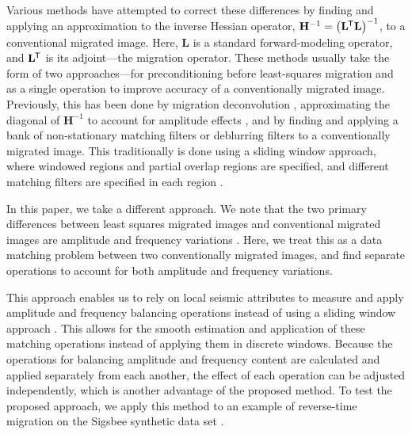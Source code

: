     Various methods have attempted to correct these differences by finding and applying an approximation to the inverse Hessian operator, $\mathbf{H}^{-1} = \left (\mathbf{L}^{\mkern-1.5mu\mathsf{T}}\mathbf{L} \right )^{-1}$, to a conventional migrated image.
    Here, $\mathbf{L}$ is a standard forward-modeling operator, and $\mathbf{L}^{\mkern-1.5mu\mathsf{T}}$ is its adjoint---the migration operator.
    These methods usually take the form of two approaches---for preconditioning before least-squares migration and as a single operation to improve accuracy of a conventionally migrated image.
    Previously, this has been done by migration deconvolution \cite[]{poststack,prestack}, approximating the diagonal of $\mathbf{H}^{-1}$ to account for amplitude effects \cite[]{amp,diagamp}, and by finding and applying a bank of non-stationary matching filters \cite[]{imop,rtmmf} or deblurring filters \cite[]{debfilt} to a conventionally migrated image.
    This traditionally is done using a sliding window approach, where windowed regions and partial overlap regions are specified, and different matching filters are specified in each region \cite[]{seiinv}.

    In this paper, we take a different approach. 
    We note that the two primary differences between least squares migrated images and conventional migrated images are amplitude and frequency variations \cite[]{Hou2015, Hou2016}. 
    Here, we treat this as a data matching problem between two conventionally migrated images, and find separate operations to account for both amplitude and frequency variations.

    This approach enables us to rely on local seismic attributes to measure and apply amplitude and frequency balancing operations instead of using a sliding window approach \cite[]{attr}.
This allows for the smooth estimation and application of these matching operations instead of applying them in discrete windows.
    Because the operations for balancing amplitude and frequency content are calculated and applied separately from each another, the effect of each operation can be adjusted independently, which is another advantage of the proposed method.
    To test the proposed approach, we apply this method to an example of reverse-time migration on the Sigsbee synthetic data set \cite[]{sigsbee}. 

